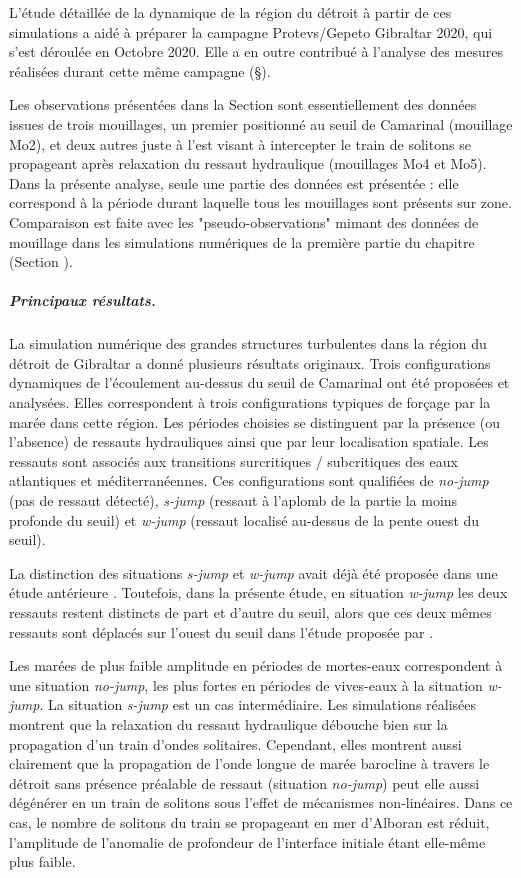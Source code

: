 L'étude détaillée de la dynamique de la région du détroit à partir de ces simulations a aidé à préparer la campagne Protevs/Gepeto Gibraltar 2020, qui s'est déroulée en Octobre 2020. Elle a en outre contribué à l'analyse des mesures réalisées durant cette même campagne (\S {}).

Les observations présentées dans la Section  sont essentiellement des données issues de trois mouillages, un premier positionné au seuil de Camarinal (mouillage Mo2), et deux autres juste à l'est visant à intercepter le train de solitons se propageant après relaxation du ressaut hydraulique (mouillages Mo4 et Mo5). Dans la présente analyse, seule une partie des données est présentée : elle correspond à la période durant laquelle tous les mouillages sont présents sur zone. Comparaison est faite avec les "pseudo-observations" mimant des données de mouillage dans les simulations numériques de la première partie du chapitre (Section ).

\subparagraph{Principaux résultats.}
La simulation numérique des grandes structures turbulentes dans la région du détroit de Gibraltar a donné plusieurs résultats originaux. Trois configurations dynamiques de l'écoulement au-dessus du seuil de Camarinal ont été proposées et analysées. Elles correspondent à trois configurations typiques de forçage par la marée dans cette région. Les périodes choisies se distinguent par la présence (ou l'absence) de ressauts hydrauliques ainsi que par leur localisation spatiale. Les ressauts sont associés aux transitions surcritiques / subcritiques des eaux atlantiques et méditerranéennes. Ces configurations sont qualifiées de \textit{no-jump} (pas de ressaut détecté), \textit{s-jump} (ressaut à l'aplomb de la partie la moins profonde du seuil) et \textit{w-jump} (ressaut localisé au-dessus de la pente ouest du seuil).

La distinction des situations \textit{s-jump} et \textit{w-jump} avait déjà été proposée dans une étude antérieure \citep{sanchez-garrido_2011}. Toutefois, dans la présente étude, en situation \textit{w-jump} les deux ressauts restent distincts de part et d'autre du seuil, alors que ces deux mêmes ressauts sont déplacés sur l'ouest du seuil dans l'étude proposée par \citet{sanchez-garrido_2011}.

Les marées de plus faible amplitude en périodes de mortes-eaux correspondent à une situation \textit{no-jump}, les plus fortes en périodes de vives-eaux à la situation \textit{w-jump}. La situation \textit{s-jump} est un cas intermédiaire. Les simulations réalisées montrent que la relaxation du ressaut hydraulique débouche bien sur la propagation d'un train d'ondes solitaires. Cependant, elles montrent aussi clairement que la propagation de l'onde longue de marée barocline à travers le détroit sans présence préalable de ressaut (situation  \textit{no-jump}) peut elle aussi dégénérer en un train de solitons sous l'effet de mécanismes non-linéaires. Dans ce cas, le nombre de solitons du train se propageant en mer d'Alboran est réduit, l'amplitude de l'anomalie de profondeur de l'interface initiale étant elle-même plus faible.

